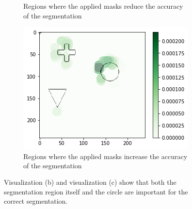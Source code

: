 \begin{figure}[H]
\begin{subfigure}[t]{.34\textwidth}
        \caption{Regions where the applied masks reduce the accuracy of the segmentation}
    \end{subfigure}\hfill%
    \begin{subfigure}[t]{.36\textwidth}
        \centering
        \includegraphics[width=\linewidth]{chapters/06_hdm/testnet/3.png}
        \caption{Regions where the applied masks increase the accuracy of the segmentation}
    \end{subfigure}
    \caption{Visualization (b) and visualization (c) show that both the segmentation region itself and the circle are important for the correct segmentation.}
    \label{hdm_testnet_1}
\end{figure}

